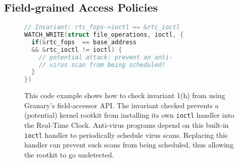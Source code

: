 \documentclass[letterpaper,twocolumn,10pt]{article}
\let\ORIGcaption\caption
\renewcommand{\caption}[2][\compressedcaption]{%
\def\compressedcaption{#2}%
    \vspace{-12pt}%
    \ORIGcaption[#1]{#2}%
    \vspace{-12pt}}
\begin{document}







\subsection{Field-grained Access Policies\label{sec:access_policies}}

\begin{figure}[t]
\begin{lstlisting}[language=C,basicstyle=\footnotesize\ttfamily]
// Invariant: rtc_fops->ioctl == &rtc_ioctl
WATCH_WRITE(struct file_operations, ioctl, {
  if(&rtc_fops  == base_address
  && &rtc_ioctl != ioctl) {
    // potential attack: prevent an anti-
    // virus scan from being scheduled!
  }
})
\end{lstlisting}
\caption{\label{fig:field_invariant_check}This code example shows how to check invariant 1(h) from \cite{GibraltarKernelInvariants} using Granary's field-accessor API. The invariant checked prevents a (potential) kernel rootkit from installing its own \texttt{ioctl} handler into the Real-Time Clock. Anti-virus programs depend on this built-in \texttt{ioctl} handler to periodically schedule virus scans. Replacing this handler can prevent such scans from being scheduled, thus allowing the rootkit to go undetected.}
\end{figure}
\end{document}
